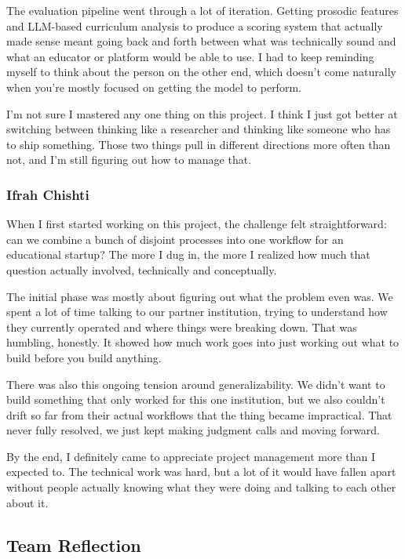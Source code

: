   The evaluation pipeline went through a lot of iteration. Getting prosodic features and LLM-based curriculum analysis  
  to produce a scoring system that actually made sense meant going back and forth between what was technically sound and
   what an educator or platform would be able to use. I had to keep reminding myself to think about the person on the   
  other end, which doesn't come naturally when you're mostly focused on getting the model to perform.
                                                      
  I'm not sure I mastered any one thing on this project. I think I just got better at switching between thinking like a 
  researcher and thinking like someone who has to ship something. Those two things pull in different directions more
  often than not, and I'm still figuring out how to manage that.         



\subsubsection{Ifrah Chishti}

  When I first started working on this project, the challenge felt straightforward: can we combine a bunch of disjoint
  processes into one workflow for an educational startup? The more I dug in, the more I realized how much that question
  actually involved, technically and conceptually.

  The initial phase was mostly about figuring out what the problem even was. We spent a lot of time talking to our
  partner institution, trying to understand how they currently operated and where things were breaking down. That was
  humbling, honestly. It showed how much work goes into just working out what to build before you build anything.

  There was also this ongoing tension around generalizability. We didn't want to build something that only worked for
  this one institution, but we also couldn't drift so far from their actual workflows that the thing became impractical.
   That never fully resolved, we just kept making judgment calls and moving forward.

  By the end, I definitely came to appreciate project management more than I expected to. The technical work was hard,
  but a lot of it would have fallen apart without people actually knowing what they were doing and talking to each other
   about it.


\subsection{Team Reflection}

